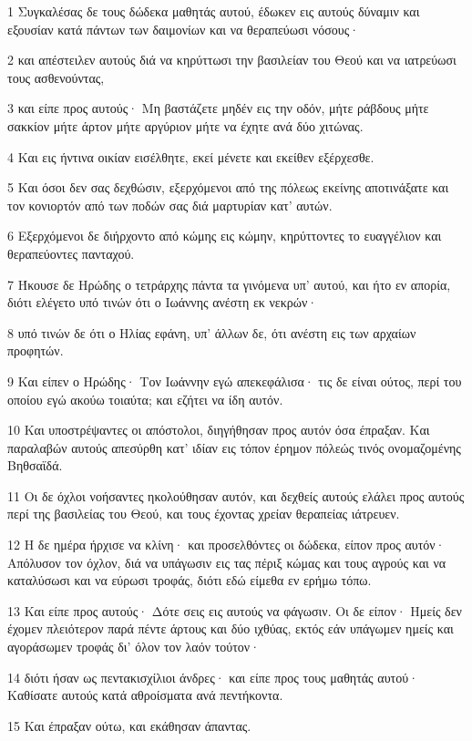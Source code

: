 \par 1 Συγκαλέσας δε τους δώδεκα μαθητάς αυτού, έδωκεν εις αυτούς δύναμιν και εξουσίαν κατά πάντων των δαιμονίων και να θεραπεύωσι νόσους·
\par 2 και απέστειλεν αυτούς διά να κηρύττωσι την βασιλείαν του Θεού και να ιατρεύωσι τους ασθενούντας,
\par 3 και είπε προς αυτούς· Μη βαστάζετε μηδέν εις την οδόν, μήτε ράβδους μήτε σακκίον μήτε άρτον μήτε αργύριον μήτε να έχητε ανά δύο χιτώνας.
\par 4 Και εις ήντινα οικίαν εισέλθητε, εκεί μένετε και εκείθεν εξέρχεσθε.
\par 5 Και όσοι δεν σας δεχθώσιν, εξερχόμενοι από της πόλεως εκείνης αποτινάξατε και τον κονιορτόν από των ποδών σας διά μαρτυρίαν κατ' αυτών.
\par 6 Εξερχόμενοι δε διήρχοντο από κώμης εις κώμην, κηρύττοντες το ευαγγέλιον και θεραπεύοντες πανταχού.
\par 7 Ήκουσε δε Ηρώδης ο τετράρχης πάντα τα γινόμενα υπ' αυτού, και ήτο εν απορία, διότι ελέγετο υπό τινών ότι ο Ιωάννης ανέστη εκ νεκρών·
\par 8 υπό τινών δε ότι ο Ηλίας εφάνη, υπ' άλλων δε, ότι ανέστη εις των αρχαίων προφητών.
\par 9 Και είπεν ο Ηρώδης· Τον Ιωάννην εγώ απεκεφάλισα· τις δε είναι ούτος, περί του οποίου εγώ ακούω τοιαύτα; και εζήτει να ίδη αυτόν.
\par 10 Και υποστρέψαντες οι απόστολοι, διηγήθησαν προς αυτόν όσα έπραξαν. Και παραλαβών αυτούς απεσύρθη κατ' ιδίαν εις τόπον έρημον πόλεώς τινός ονομαζομένης Βηθσαϊδά.
\par 11 Οι δε όχλοι νοήσαντες ηκολούθησαν αυτόν, και δεχθείς αυτούς ελάλει προς αυτούς περί της βασιλείας του Θεού, και τους έχοντας χρείαν θεραπείας ιάτρευεν.
\par 12 Η δε ημέρα ήρχισε να κλίνη· και προσελθόντες οι δώδεκα, είπον προς αυτόν· Απόλυσον τον όχλον, διά να υπάγωσιν εις τας πέριξ κώμας και τους αγρούς και να καταλύσωσι και να εύρωσι τροφάς, διότι εδώ είμεθα εν ερήμω τόπω.
\par 13 Και είπε προς αυτούς· Δότε σεις εις αυτούς να φάγωσιν. Οι δε είπον· Ημείς δεν έχομεν πλειότερον παρά πέντε άρτους και δύο ιχθύας, εκτός εάν υπάγωμεν ημείς και αγοράσωμεν τροφάς δι' όλον τον λαόν τούτον·
\par 14 διότι ήσαν ως πεντακισχίλιοι άνδρες· και είπε προς τους μαθητάς αυτού· Καθίσατε αυτούς κατά αθροίσματα ανά πεντήκοντα.
\par 15 Και έπραξαν ούτω, και εκάθησαν άπαντας.

